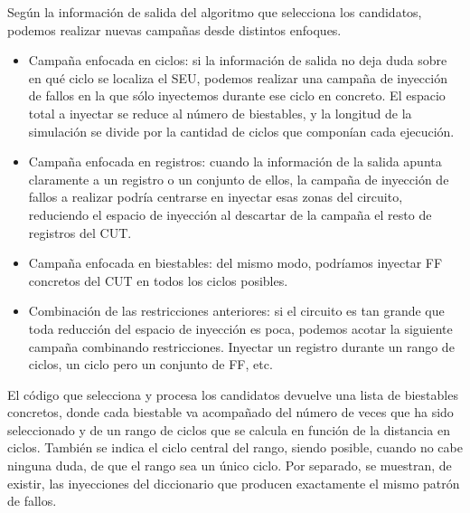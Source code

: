 Según la información de salida del algoritmo que selecciona los candidatos,
podemos realizar nuevas campañas desde distintos enfoques.
\begin{itemize}
    \item Campaña enfocada en ciclos: si la información de salida no deja duda
        sobre en qué ciclo se localiza el \gls{SEU}, podemos realizar una campaña
        de inyección de fallos en la que sólo inyectemos durante ese ciclo en
        concreto. El espacio total a inyectar se reduce al número de biestables, y
        la longitud de la simulación se divide por la cantidad de ciclos que
        componían cada ejecución.
    \item Campaña enfocada en registros: cuando la información de la salida apunta
        claramente a un registro o un conjunto de ellos, la campaña de inyección
        de fallos a realizar podría centrarse en inyectar esas zonas del circuito,
        reduciendo el espacio de inyección al descartar de la campaña el resto de
        registros del \gls{CUT}.
    \item Campaña enfocada en biestables: del mismo modo, podríamos inyectar
        \gls{FF} concretos del \gls{CUT} en todos los ciclos posibles.
    \item Combinación de las restricciones anteriores: si el circuito es tan
        grande que toda reducción del espacio de inyección es poca, podemos acotar
        la siguiente campaña combinando restricciones. Inyectar un registro
        durante un rango de ciclos, un ciclo pero un conjunto de \gls{FF}, etc.
\end{itemize}

El código que selecciona y procesa los candidatos devuelve una lista de biestables
concretos, donde cada biestable va acompañado del número de veces que ha sido
seleccionado y de un rango de ciclos que se calcula en función de la distancia en
ciclos. También se indica el ciclo central del rango, siendo posible, cuando no
cabe ninguna duda, de que el rango sea un único ciclo. Por separado, se muestran,
de existir, las inyecciones del diccionario que producen exactamente el mismo
patrón de fallos.

